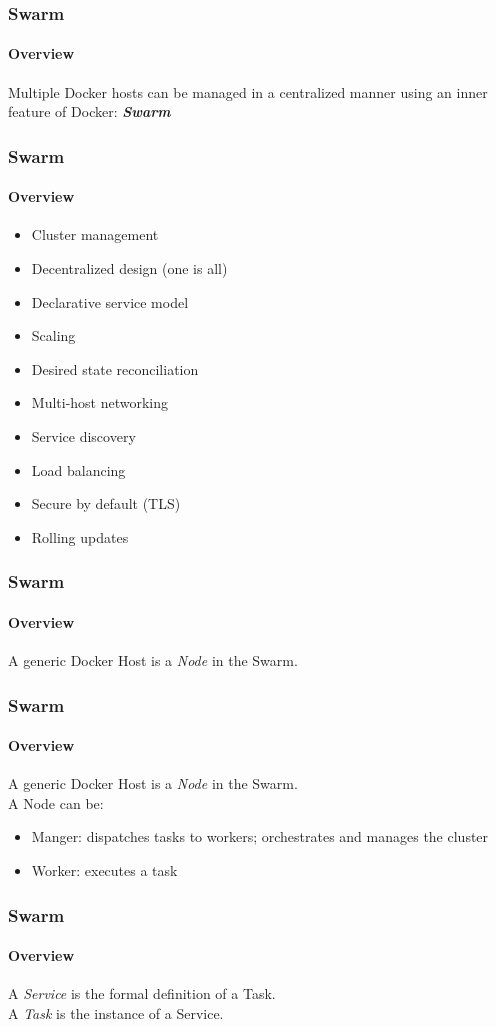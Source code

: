 \begin{frame}
\frametitle{Swarm}
\framesubtitle{Overview}
Multiple Docker hosts can be managed in a centralized manner using an inner feature of Docker: \textbf{\textit{Swarm}}
\end{frame}

\begin{frame}
\frametitle{Swarm}
\framesubtitle{Overview}
\begin{itemize}
\item Cluster management
\item Decentralized design (one is all)
\item Declarative service model
\item Scaling
\item Desired state reconciliation
\item Multi-host networking
\item Service discovery
\item Load balancing
\item Secure by default (TLS)
\item Rolling updates
\end{itemize}
\end{frame}

\begin{frame}
\frametitle{Swarm}
\framesubtitle{Overview}
A generic Docker Host is a \textit{Node} in the Swarm.
\end{frame}

\begin{frame}
\frametitle{Swarm}
\framesubtitle{Overview}
A generic Docker Host is a \textit{Node} in the Swarm.\\
\vspace{0.4cm}
A Node can be:
\begin{itemize}
\item Manger: dispatches tasks to workers; orchestrates and manages the cluster
\item Worker: executes a task  
\end{itemize}
\end{frame}

\begin{frame}
\frametitle{Swarm}
\framesubtitle{Overview}
A \textit{Service} is the formal definition of a Task.\\
\vspace{0.4cm}
A \textit{Task} is the instance of a Service.
\end{frame}


